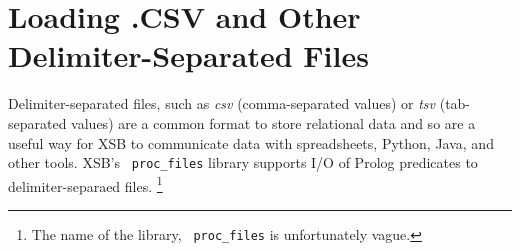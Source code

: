 \section{Loading .CSV and Other Delimiter-Separated Files} \label{sec:procfiles}


Delimiter-separated files, such as {\em csv} (comma-separated values)
or {\em tsv} (tab-separated values) are a common format to store
relational data and so are a useful way for XSB to communicate data
with spreadsheets, Python, Java, and other tools.  XSB's {\tt
  proc\_files} library supports I/O of Prolog predicates to
delimiter-separaed files. \footnote{The name of the library, {\tt
    proc\_files} is unfortunately vague.}

